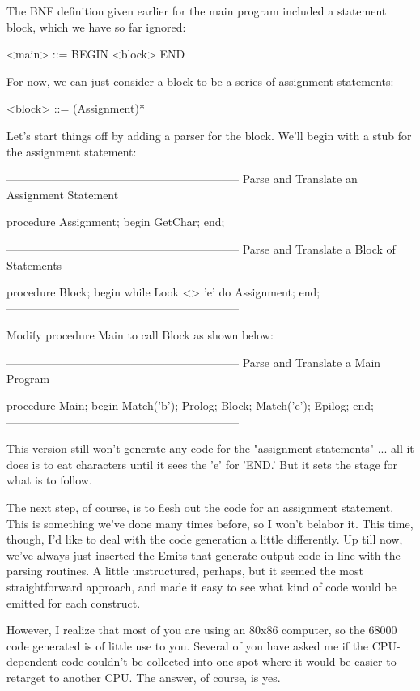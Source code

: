 \documentclass[float=false, crop=false]{standalone}
\begin{document}
The BNF definition given earlier for the main program included a statement
block, which we have so far ignored:


     <main> ::= BEGIN <block> END


For now, we can just consider a block to be a series of assignment statements:


     <block> ::= (Assignment)*


Let's start things off by adding a parser for the block. We'll begin with a stub
for the assignment statement:

\begin{code}
{--------------------------------------------------------------}
{ Parse and Translate an Assignment Statement }

procedure Assignment;
begin
   GetChar;
end;


{--------------------------------------------------------------}
{ Parse and Translate a Block of Statements }

procedure Block;
begin
   while Look <> 'e' do
      Assignment;
end;
{--------------------------------------------------------------}
\end{code}

Modify procedure Main to call Block as shown below:

\begin{code}
{--------------------------------------------------------------}
{ Parse and Translate a Main Program }

procedure Main;
begin
   Match('b');
   Prolog;
   Block;
   Match('e');
   Epilog;
end;
{--------------------------------------------------------------}
\end{code}

This version still won't generate any code for the "assignment statements" ...
all it does is to eat characters until it sees the 'e' for 'END.' But it sets
the stage for what is to follow.

The next step, of course, is to flesh out the code for an assignment statement.
This is something we've done many times before, so I won't belabor it. This
time, though, I'd like to deal with the code generation a little differently. Up
till now, we've always just inserted the Emits that generate output code in line
with the parsing routines. A little unstructured, perhaps, but it seemed the
most straightforward approach, and made it easy to see what kind of code would
be emitted for each construct.

However, I realize that most of you are using an 80x86 computer, so the 68000
code generated is of little use to you. Several of you have asked me if the
CPU-dependent code couldn't be collected into one spot where it would be easier
to retarget to another CPU. The answer, of course, is yes.
\end{document}
